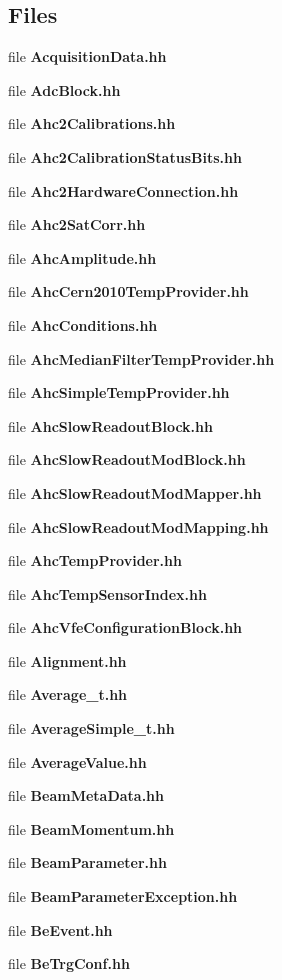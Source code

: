 \subsection*{Files}
\begin{DoxyCompactItemize}
\item 
file {\bfseries AcquisitionData.hh}
\item 
file {\bfseries AdcBlock.hh}
\item 
file {\bfseries Ahc2Calibrations.hh}
\item 
file {\bfseries Ahc2CalibrationStatusBits.hh}
\item 
file {\bfseries Ahc2HardwareConnection.hh}
\item 
file {\bfseries Ahc2SatCorr.hh}
\item 
file {\bfseries AhcAmplitude.hh}
\item 
file {\bfseries AhcCern2010TempProvider.hh}
\item 
file {\bfseries AhcConditions.hh}
\item 
file {\bfseries AhcMedianFilterTempProvider.hh}
\item 
file {\bfseries AhcSimpleTempProvider.hh}
\item 
file {\bfseries AhcSlowReadoutBlock.hh}
\item 
file {\bfseries AhcSlowReadoutModBlock.hh}
\item 
file {\bfseries AhcSlowReadoutModMapper.hh}
\item 
file {\bfseries AhcSlowReadoutModMapping.hh}
\item 
file {\bfseries AhcTempProvider.hh}
\item 
file {\bfseries AhcTempSensorIndex.hh}
\item 
file {\bfseries AhcVfeConfigurationBlock.hh}
\item 
file {\bfseries Alignment.hh}
\item 
file {\bfseries Average\_\-t.hh}
\item 
file {\bfseries AverageSimple\_\-t.hh}
\item 
file {\bfseries AverageValue.hh}
\item 
file {\bfseries BeamMetaData.hh}
\item 
file {\bfseries BeamMomentum.hh}
\item 
file {\bfseries BeamParameter.hh}
\item 
file {\bfseries BeamParameterException.hh}
\item 
file {\bfseries BeEvent.hh}
\item 
file {\bfseries BeTrgConf.hh}

\end{DoxyCompactItemize}
